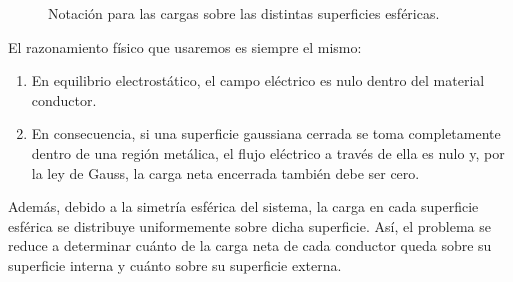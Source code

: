 \documentclass[11pt]{article}
\begin{document}
\begin{figure}[h!]
\centering
{}
\caption{Notación para las cargas sobre las distintas superficies esféricas.}
\label{fig:problema8-esquema}
\end{figure}

El razonamiento físico que usaremos es siempre el mismo:
\begin{enumerate}[label=\arabic*.]
    \item En equilibrio electrostático, el campo eléctrico es nulo dentro del material conductor.
    \item En consecuencia, si una superficie gaussiana cerrada se toma completamente dentro de una región metálica, el flujo eléctrico a través de ella es nulo y, por la ley de Gauss, la carga neta encerrada también debe ser cero.
\end{enumerate}

Además, debido a la simetría esférica del sistema, la carga en cada superficie esférica se distribuye uniformemente sobre dicha superficie. Así, el problema se reduce a determinar cuánto de la carga neta de cada conductor queda sobre su superficie interna y cuánto sobre su superficie externa.
\end{document}
